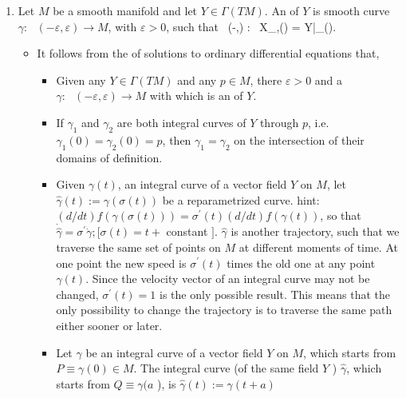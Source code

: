 \documentclass{article}
\newcommand{\cl}{:\text{ }}
\begin{document}
\begin{enumerate}
    \item {}  Let $M$ be a smooth manifold and let $Y\in \Gamma(TM)$. An  of $Y$ is smooth curve $\gamma\cl(-\varepsilon,\varepsilon)\to M$, with $\varepsilon > 0$, such that
\bse
\forall \, \lambda \in (-\varepsilon,\varepsilon) : \ X_{\gamma,\gamma(\lambda)} = Y|_{\gamma(\lambda)}.
\ese
\begin{itemize}
    \item {} It follows from the  of solutions to ordinary differential equations \cite{hartman2002ordinary} that, 
    \begin{itemize}[$\ast$]
        \item {} Given any $Y\in \Gamma(TM)$ and any $p\in M$, there  $\varepsilon >0$ and a  $\gamma\cl (-\varepsilon,\varepsilon) \to M$ with  which is an  of $Y$. 
        \item {} If $\gamma_1$ and $\gamma_2$ are both integral curves of $Y$ through $p$, i.e.\ $\gamma_1(0)=\gamma_2(0) = p$, then $\gamma_1=\gamma_2$ on the intersection of their domains of definition. 
        \item {}
        Given $\gamma(t)$, an integral curve of a vector field $Y$ on $M$, let $\hat{\gamma}(t):=\gamma(\sigma(t))$ be a reparametrized curve. 
{\tiny         
hint: $(d / d t) f(\gamma(\sigma(t)))=\sigma^{\prime}(t)(d / d t) f(\gamma(t))$, so that $\dot{\hat{\gamma}}=\sigma^{\prime} \dot{\gamma} ;[\sigma(t)=t+$ constant $]$.  $\hat{\gamma}$ is another trajectory, such that we traverse the same set of points on $M$ at different moments of time. At one point the new speed is $\sigma^{\prime}(t)$ times the old one at any point $\gamma(t)$.  Since the velocity vector of an integral curve may not be changed, $\sigma^{\prime}(t)=1$ is the only possible result. This means that the only possibility to change the trajectory is to traverse the same path either sooner or later.}
\item Let $\gamma$ be an integral curve of a vector field $Y$ on $M$, which starts from $P \equiv \gamma(0) \in M$. The integral curve (of the same field $Y$ ) $\hat{\gamma}$, which starts from $Q \equiv \gamma(a$ ), is $\hat{\gamma}(t):=\gamma(t+a)$
        

\end{itemize}
\end{itemize}
\end{enumerate}
\end{document}
